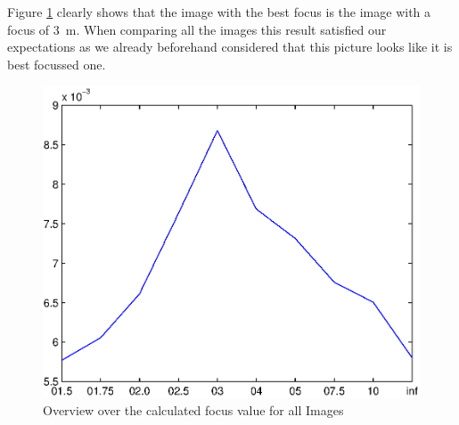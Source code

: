 \documentclass[
a4paper,     %
11pt         %
]{scrartcl}  %
\begin{document}
Figure \ref{fig:autofocus_hist} clearly shows that the image with the best focus is the image with a focus of \SI{3}{m}.
When comparing all the images this result satisfied our expectations as we already beforehand considered that this picture looks like it is best focussed one.

\begin{figure}[ht!]
 \centering
 \includegraphics{./Bildg_Messtechnik_Lab/Autofokus/html/main_01.eps}
 \caption{Overview over the calculated focus value for all Images}
 \label{fig:autofocus_hist}
\end{figure}
\end{document}
